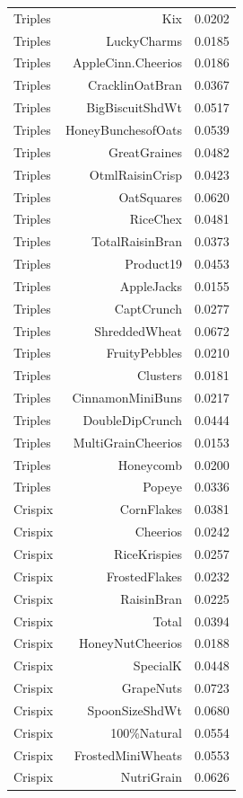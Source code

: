 \begin{longtable}{@{}lrr@{}}
Triples & Kix & 0.0202 \\
Triples & LuckyCharms & 0.0185 \\
Triples & AppleCinn.Cheerios & 0.0186 \\
Triples & CracklinOatBran & 0.0367 \\
Triples & BigBiscuitShdWt & 0.0517 \\
Triples & HoneyBunchesofOats & 0.0539 \\
Triples & GreatGraines & 0.0482 \\
Triples & OtmlRaisinCrisp & 0.0423 \\
Triples & OatSquares & 0.0620 \\
Triples & RiceChex & 0.0481 \\
Triples & TotalRaisinBran & 0.0373 \\
Triples & Product19 & 0.0453 \\
Triples & AppleJacks & 0.0155 \\
Triples & CaptCrunch & 0.0277 \\
Triples & ShreddedWheat & 0.0672 \\
Triples & FruityPebbles & 0.0210 \\
Triples & Clusters & 0.0181 \\
Triples & CinnamonMiniBuns & 0.0217 \\
Triples & DoubleDipCrunch & 0.0444 \\
Triples & MultiGrainCheerios & 0.0153 \\
Triples & Honeycomb & 0.0200 \\
Triples & Popeye & 0.0336 \\
Crispix & CornFlakes & 0.0381 \\
Crispix & Cheerios & 0.0242 \\
Crispix & RiceKrispies & 0.0257 \\
Crispix & FrostedFlakes & 0.0232 \\
Crispix & RaisinBran & 0.0225 \\
Crispix & Total & 0.0394 \\
Crispix & HoneyNutCheerios & 0.0188 \\
Crispix & SpecialK & 0.0448 \\
Crispix & GrapeNuts & 0.0723 \\
Crispix & SpoonSizeShdWt & 0.0680 \\
Crispix & 100\%Natural & 0.0554 \\
Crispix & FrostedMiniWheats & 0.0553 \\
Crispix & NutriGrain & 0.0626 \\

\end{longtable}
